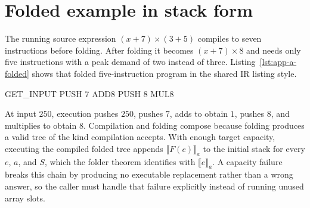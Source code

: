 \section{Folded example in stack form}
\label{sec:app-a-example}

The running source expression $(x+7)\times(3+5)$ compiles to seven instructions before folding.
After folding it becomes $(x+7)\times8$ and needs only five instructions with a peak demand of two instead of three.
Listing~\ref{lst:app-a-folded} shows that folded five-instruction program in the shared IR listing style.
\begin{irlisting}[caption={Folded stack code for $(x+7)\times8$.},label={lst:app-a-folded}]
GET_INPUT
PUSH 7
ADD8
PUSH 8
MUL8
\end{irlisting}
At input $250$, execution pushes $250$, pushes $7$, adds to obtain $1$, pushes $8$, and multiplies to obtain $8$.
Compilation and folding compose because folding produces a valid tree of the kind compilation accepts.
With enough target capacity, executing the compiled folded tree appends $\llbracket F(e)\rrbracket_a$ to the initial stack for every $e$, $a$, and $S$, which the folder theorem identifies with $\llbracket e\rrbracket_a$.
A capacity failure breaks this chain by producing no executable replacement rather than a wrong answer, so the caller must handle that failure explicitly instead of running unused array slots.
